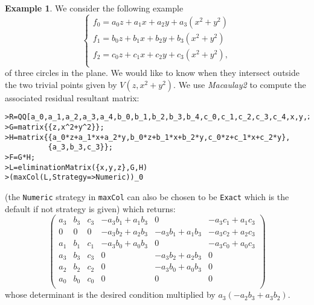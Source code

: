 \documentclass[10pt]{amsart}
\theoremstyle{plain}
\theoremstyle{definition}
\newtheorem{exmp}[thm]{Example}
\begin{document}
\begin{exmp}\label{exmpCiRes}
 We consider the following example
$$\left\{
\begin{array}{l}
f_{0} =
a_0z+a_1x+a_2y+a_3(x^2+y^2)\\
f_{1} =
b_0z+b_1x+b_2y+b_3(x^2+y^2)\\
f_{2} =
c_0z+c_1x+c_2y+c_3(x^2+y^2),\\
\end{array}
\right.$$
of three circles in the plane. We would like to know when they intersect outside the two trivial points given by $V(z,x^2+y^2)$. We use \textit{Macaulay2} to compute the associated residual resultant matrix:

\begin{verbatim}
>R=QQ[a_0,a_1,a_2,a_3,a_4,b_0,b_1,b_2,b_3,b_4,c_0,c_1,c_2,c_3,c_4,x,y,z]; 
>G=matrix{{z,x^2+y^2}}; 
>H=matrix{{a_0*z+a_1*x+a_2*y,b_0*z+b_1*x+b_2*y,c_0*z+c_1*x+c_2*y}, 
          {a_3,b_3,c_3}}; 
>F=G*H;  
>L=eliminationMatrix({x,y,z},G,H)
>(maxCol(L,Strategy=>Numeric))_0
\end{verbatim}
(the {\tt Numeric} strategy in {\tt maxCol} can also be chosen to be {\tt Exact} which is the default if not strategy is given) which returns:
$$\begin{pmatrix}{{a}}_{{3}}&
      {{b}}_{{3}}&
      {{c}}_{{3}}&
      -{{a}}_{{3}} {{b}}_{1}+{{a}}_{1} {{b}}_{{3}}&
      0&
      -{{a}}_{{3}} {{c}}_{1}+{{a}}_{1} {{c}}_{{3}}\\
      0&
      0&
      0&
      -{{a}}_{{3}} {{b}}_{{2}}+{{a}}_{{2}} {{b}}_{{3}}&
      -{{a}}_{{3}} {{b}}_{1}+{{a}}_{1} {{b}}_{{3}}&
      -{{a}}_{{3}} {{c}}_{{2}}+{{a}}_{{2}} {{c}}_{{3}}\\
      {{a}}_{1}&
      {{b}}_{1}&
      {{c}}_{1}&
      -{{a}}_{{3}} {{b}}_{0}+{{a}}_{0} {{b}}_{{3}}&
      0&
      -{{a}}_{{3}} {{c}}_{0}+{{a}}_{0} {{c}}_{{3}}\\
      {{a}}_{{3}}&
      {{b}}_{{3}}&
      {{c}}_{{3}}&
      0&
      -{{a}}_{{3}} {{b}}_{{2}}+{{a}}_{{2}} {{b}}_{{3}}&
      0\\
      {{a}}_{{2}}&
      {{b}}_{{2}}&
      {{c}}_{{2}}&
      0&
      -{{a}}_{{3}} {{b}}_{0}+{{a}}_{0} {{b}}_{{3}}&
      0\\
      {{a}}_{0}&
      {{b}}_{0}&
      {{c}}_{0}&
      0&
      0&
      0\\
      \end{pmatrix}$$
whose determinant is the desired condition multiplied by $a_3(-a_2b_3+a_3b_2)$.
\end{exmp}
\end{document}
